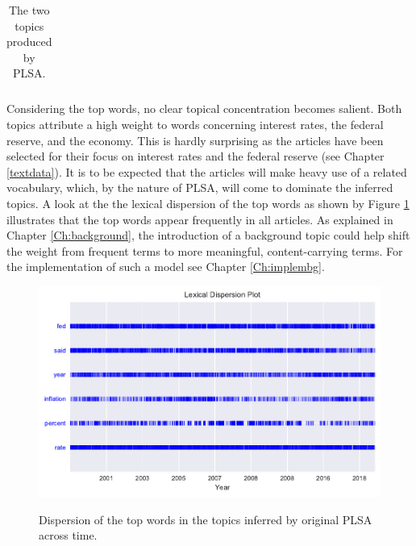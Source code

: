 \documentclass[11pt,a4paper,english,oneside]{book}
\numberwithin{equation}{chapter}
\begin{document}
\begin{table}[h]
\begin{tabular}{ p{3cm}  p{2cm}  p{3cm}  p{2cm} }
		\bottomrule %
	\end{tabular}
	\caption{The two topics produced by PLSA.} %
	\label{tab:topic1} %
\end{table}

Considering the top words, no clear topical concentration becomes salient. Both topics attribute a high weight to words concerning interest rates, the federal reserve, and the economy. This is hardly surprising as the articles have been selected for their focus on interest rates and the federal reserve (see Chapter \ref{textdata}). It is to be expected that the articles will make heavy use of a related vocabulary, which, by the nature of PLSA, will come to dominate the inferred topics. A look at the the lexical dispersion of the top words as shown by Figure \ref{dispersionPLSAorig} illustrates that the top words appear frequently in all articles. As explained in Chapter \ref{Ch:background}, the introduction of a background topic could help shift the weight from frequent terms to more meaningful, content-carrying terms. For the implementation of such a model see Chapter \ref{Ch:implembg}.


\begin{figure}
	\caption{Dispersion of the top words in the topics inferred by original PLSA across time.}
	\centering
	\includegraphics[scale=1]{Images/dispersionplot_topicPLSAorig.pdf}
	\label{dispersionPLSAorig}
\end{figure}
\end{document}
